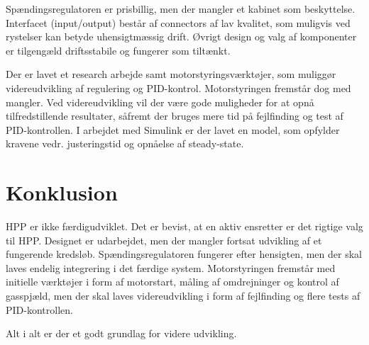 Spændingsregulatoren er prisbillig, men der mangler et kabinet som beskyttelse. Interfacet (input/output) består af connectors af lav kvalitet, som muligvis ved rystelser kan betyde uhensigtmæssig drift. Øvrigt design og valg af komponenter er tilgengæld driftsstabile og fungerer som tiltænkt.

Der er lavet et research arbejde samt motorstyringsværktøjer, som muliggør videreudvikling af regulering og PID-kontrol. Motorstyringen fremstår dog med mangler. Ved videreudvikling vil der være gode muligheder for at opnå tilfredstillende resultater, såfremt der bruges mere tid på fejlfinding og test af PID-kontrollen. I arbejdet med Simulink er der lavet en model, som opfylder kravene vedr. justeringstid og opnåelse af steady-state.


\section{Konklusion}
\label{sec:konklusion}

HPP er ikke færdigudviklet. Det er bevist, at en aktiv ensretter er det rigtige valg til HPP. Designet er udarbejdet, men der mangler fortsat udvikling af et fungerende kredsløb. Spændingsregulatoren fungerer efter hensigten, men der skal laves endelig integrering i det færdige system. Motorstyringen fremstår med initielle værktøjer i form af motorstart, måling af omdrejninger og kontrol af gasspjæld, men der skal laves videreudvikling i form af fejlfinding og flere tests af PID-kontrollen.

Alt i alt er der et godt grundlag for videre udvikling.
